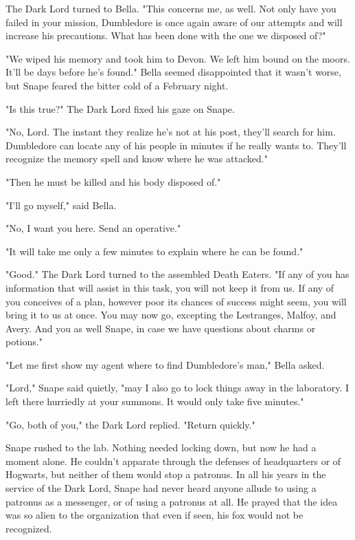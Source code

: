 \documentclass[a4paper,11pt]{article}
\begin{document}
The Dark Lord turned to Bella. "This concerns me, as well. Not only have you failed in your mission, Dumbledore is once again aware of our attempts and will increase his precautions. What has been done with the one we disposed of?"

"We wiped his memory and took him to Devon. We left him bound on the moors. It'll be days before he's found." Bella seemed disappointed that it wasn't worse, but Snape feared the bitter cold of a February night.

"Is this true?" The Dark Lord fixed his gaze on Snape.

"No, Lord. The instant they realize he's not at his post, they'll search for him. Dumbledore can locate any of his people in minutes if he really wants to. They'll recognize the memory spell and know where he was attacked."

"Then he must be killed and his body disposed of."

"I'll go myself," said Bella.

"No, I want you here. Send an operative."

"It will take me only a few minutes to explain where he can be found."

"Good." The Dark Lord turned to the assembled Death Eaters. "If any of you has information that will assist in this task, you will not keep it from us. If any of you conceives of a plan, however poor its chances of success might seem, you will bring it to us at once. You may now go, excepting the Lestranges, Malfoy, and Avery. And you as well Snape, in case we have questions about charms or potions."

"Let me first show my agent where to find Dumbledore's man," Bella asked.

"Lord," Snape said quietly, "may I also go to lock things away in the laboratory. I left there hurriedly at your summons. It would only take five minutes."

"Go, both of you," the Dark Lord replied. "Return quickly."

Snape rushed to the lab. Nothing needed locking down, but now he had a moment alone. He couldn't apparate through the defenses of headquarters or of Hogwarts, but neither of them would stop a patronus. In all his years in the service of the Dark Lord, Snape had never heard anyone allude to using a patronus as a messenger, or of using a patronus at all. He prayed that the idea was so alien to the organization that even if seen, his fox would not be recognized.
\end{document}
